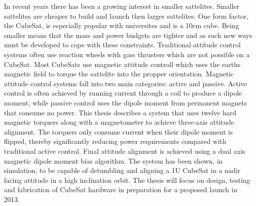 In recent years there has been a growing interest in smaller sattelites. Smaller sattelites are cheaper to build and launch then larger sattelites. One form factor, the CubeSat, is especially popular with universites and is a 10cm cube. Being smaller means that the mass and power budgets are tighter and as such new ways must be developed to cope with these constraints. Traditional attitude control systems often use reaction wheels with gass thrusters which are not possible on a CubeSat. Most CubeSats use magnetic attitude controll which uses the earths magnetic field to torque the sattelite into the propper orientation. Magnetic attitude control systems fall into two main categories: active and passive. Active control is often achieved by running current through a coil to produce a dipole moment, while passive control uses the dipole moment from permanent magnets that consume no power. This thesis describes a system that uses twelve hard magnetic torquers along with a magnetometer to achieve three-axis attitude alignment. The torquers only consume current when their dipole moment is flipped, thereby significantly reducing power requirements compared with traditional active control.  Final attitude alignment is achieved using a dual axis magnetic dipole moment bias algorithm. The system has been shown, in simulation, to be capable of detumbling and aligning a 1U CubeSat in a nadir facing attitude in a high inclination orbit. The thesis will focus on design, testing and fabrication of CubeSat hardware in preparation for a proposed launch in 2013.

